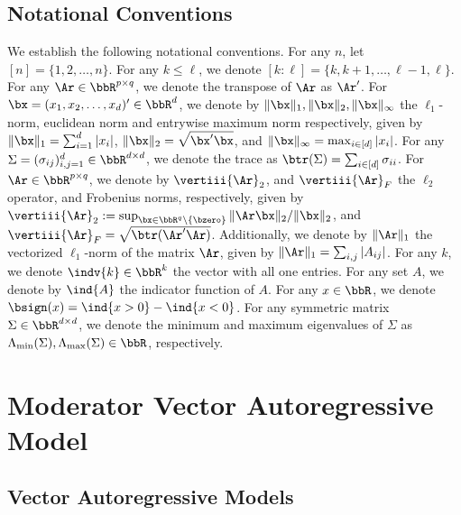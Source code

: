 \subsection*{Notational Conventions} 

We establish the following notational conventions. For any $n$, let $[n] = \{1,2,\ldots ,n\}$. For any $k\leq \ell$, we denote $[k : \ell] = \{k,k+1,\ldots, \ell-1, \ell\}$. For any $\Ar \in\bbR^{p\times q}$, we denote the transpose of $\Ar$ as $\Ar'$. For $\bx= (x_1,x_2,\ldots ,x_d)'\in\bbR^{d}$, we denote by $\|\bx\|_1, \|\bx\|_2, \|\bx\|_{\infty}$ the $\ell_1$-norm, euclidean norm and entrywise maximum norm respectively, given by $\|\bx\|_1 = \sum_{i=1}^d |x_i|$, $\|\bx\|_2 = \sqrt{\bx'\bx}$, and $\|\bx\|_\infty = \max_{i\in[d]} |x_i|$. For any $\Sigma= (\sigma_{ij})_{i,j=1}^d\in\bbR^{d\times d}$, we denote the trace as $\btr(\Sigma) = \sum_{i\in[d]} \sigma_{ii}$. For $\Ar \in\bbR^{p\times q}$, we denote by $\vertiii{\Ar}_2$, and $\vertiii{\Ar}_F$  the $\ell_2$ operator,  and Frobenius norms, respectively, given by $\vertiii{\Ar}_2 := \sup_{\bx\in\bbR^{q}\setminus\{\bzero\}} \|\Ar \bx\|_2 / \|\bx\|_2$, and $\vertiii{\Ar}_F = \sqrt{\btr(\Ar'\Ar)}$. Additionally, we denote by $\|\Ar\|_{1}$ the vectorized $\ell_1$-norm of the matrix $\Ar$, given by $\|\Ar\|_1 = \sum_{i,j}|A_{ij}|$. For any $k$, we denote $\indv{k}\in\bbR^{k}$ the vector with all one entries. For any set $A$, we denote by $\ind{A}$ the indicator function of $A$. For any $x\in\bbR$, we denote $\bsign(x) = \ind{x> 0} - \ind{x<0}$. For any symmetric matrix $\Sigma\in\bbR^{d\times d}$, we denote the minimum and maximum eigenvalues of $\Sigma$ as $\Lambda_{\min}(\Sigma),\Lambda_{\max}(\Sigma)\in\bbR$, respectively.




\section{Moderator Vector Autoregressive Model}\label{section:mod-var}




\subsection{Vector Autoregressive Models}

